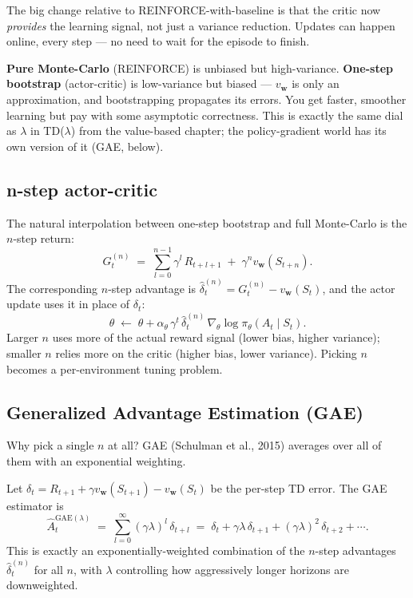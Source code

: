 \documentclass[11pt, oneside]{book}
\begin{document}
The big change relative to REINFORCE-with-baseline is that the critic now
\emph{provides} the learning signal, not just a variance reduction.
Updates can happen online, every step --- no need to wait for the episode to finish.

\begin{intbox}[title={Bias--variance trade-off again}]
\textbf{Pure Monte-Carlo} (REINFORCE) is unbiased but high-variance.
\textbf{One-step bootstrap} (actor-critic) is low-variance but biased --- $v_\mathbf{w}$
is only an approximation, and bootstrapping propagates its errors.
You get faster, smoother learning but pay with some asymptotic correctness.
This is exactly the same dial as $\lambda$ in TD($\lambda$) from the value-based
chapter; the policy-gradient world has its own version of it (GAE, below).
\end{intbox}

\subsection{n-step actor-critic}

The natural interpolation between one-step bootstrap and full Monte-Carlo is the
$n$-step return:
\[
  G_t^{(n)} \;=\; \sum_{l=0}^{n-1} \gamma^l\, R_{t+l+1} \;+\; \gamma^n v_\mathbf{w}(S_{t+n}).
\]
The corresponding $n$-step advantage is $\hat\delta_t^{(n)} = G_t^{(n)} - v_\mathbf{w}(S_t)$,
and the actor update uses it in place of $\delta_t$:
\[
  \theta \;\leftarrow\; \theta + \alpha_\theta\, \gamma^t\, \hat\delta_t^{(n)}\, \nabla_\theta \log \pi_\theta(A_t \mid S_t).
\]
Larger $n$ uses more of the actual reward signal (lower bias, higher variance);
smaller $n$ relies more on the critic (higher bias, lower variance).
Picking $n$ becomes a per-environment tuning problem.

\subsection{Generalized Advantage Estimation (GAE)}

Why pick a single $n$ at all? GAE (Schulman et al., 2015) averages over all of them
with an exponential weighting.

Let $\delta_t = R_{t+1} + \gamma v_\mathbf{w}(S_{t+1}) - v_\mathbf{w}(S_t)$ be the
per-step TD error. The GAE estimator is
\[
  \hat A_t^{\text{GAE}(\lambda)}
  \;=\; \sum_{l=0}^{\infty} (\gamma\lambda)^l\, \delta_{t+l}
  \;=\; \delta_t + \gamma\lambda\, \delta_{t+1} + (\gamma\lambda)^2\, \delta_{t+2} + \cdots.
\]
This is exactly an exponentially-weighted combination of the $n$-step advantages
$\hat\delta_t^{(n)}$ for all $n$, with $\lambda$ controlling how aggressively longer
horizons are downweighted.
\end{document}
